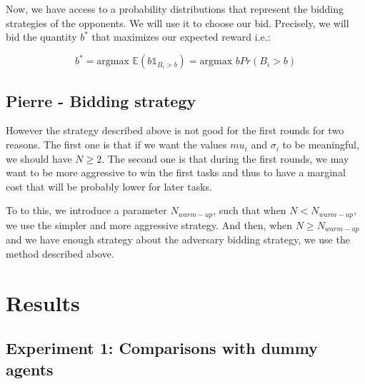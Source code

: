 \documentclass[11pt]{article}
\begin{document}
Now, we have access to a probability distributions that represent the bidding strategies of the opponents. We will use it to choose our bid. Precisely, we will bid the quantity $b^*$ that maximizes our expected reward i.e.:

$$
b^* = \text{argmax }\mathbb{E}(b\mathds{1}_{B_i > b}) = \text{argmax }bPr(B_i > b)
$$

\subsection{Pierre - Bidding strategy}

However the strategy described above is not good for the first rounds for two reasons. The first one is that if we want the values $mu_i$ and $\sigma_i$ to be meaningful, we should have $N \geq 2$. The second one is that during the first rounds, we may want to be more aggressive to win the first tasks and thus to have a marginal cost that will be probably lower for later tasks.

To to this, we introduce a parameter $N_{warm-up}$, such that when $N < N_{warm-up}$, we use the simpler and more aggressive strategy. And then, when $N \geq N_{warm-up}$ and we have enough strategy about the adversary bidding strategy, we use the method described above.



\section{Results}

\subsection{Experiment 1: Comparisons with dummy agents}
\end{document}
